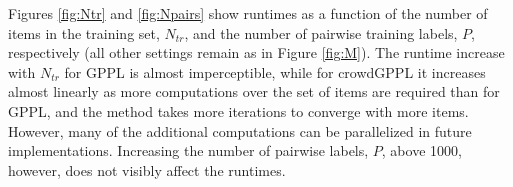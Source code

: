 Figures \ref{fig:Ntr} and \ref{fig:Npairs} show runtimes as a
function of the number of items in the training set, $N_{tr}$,
and the number of pairwise training labels, $P$, respectively (all other settings remain as in Figure \ref{fig:M}).
The runtime increase with $N_{tr}$ for GPPL is almost imperceptible,
while for crowdGPPL it increases almost linearly as more
computations over the set of items are required than for GPPL, and the method takes more iterations to converge with more items. 
However, many of the additional computations can be parallelized
in future implementations.
Increasing the number of pairwise labels, $P$, above 1000, however, does not visibly affect the runtimes.

